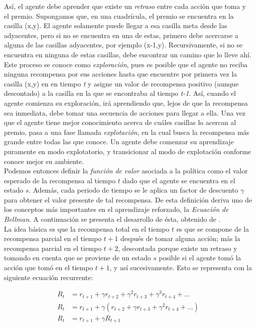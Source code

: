 As\'i, el agente debe aprender que existe un \textit{retraso} entre cada acci\'on que toma y el premio. Supongamos que, en una cuadr\'icula, el premio se encuentra en la casilla (x,y). El agente solamente puede llegar a esa casilla meta desde las adyacentes, pero si no se encuentra en una de estas, primero debe acercarse a alguna de las casillas adyacentes, por ejemplo (x-1,y). Recursivamente, si no se encuentra en ninguna de estas casillas, debe encontrar un camino que lo lleve ah\'i. Este proceso se conoce como \textit{exploraci\'on}, pues es posible que el agente no reciba ninguna recompensa por sus acciones hasta que encuentre por primera vez la casilla (x,y) en en tiempo \textit{t} y asigne un valor de recompensa positivo (aunque descontado) a la casilla en la que se encontraba al tiempo \textit{t-1}. As\'i, cuando el agente comienza su exploraci\'on, ir\'a aprendiendo que, lejos de que la recompensa sea inmediata, debe tomar una secuencia de acciones para llegar a ella. Una vez que el agente tiene mejor conocimiento acerca de cu\'ales casillas lo acercan al premio, pasa a una fase llamada \textit{explotaci\'on}, en la cual busca la recompensa m\'as grande entre todas las que conoce. Un agente debe comenzar su aprendizaje puramente en modo explotatorio, y transicionar al modo de explotaci\'on conforme conoce mejor su ambiente.\\

Podemos entonces definir la \textit{funci\'on de valor} asociada a la pol\'itica como el valor esperado de la recompensa al tiempo $t$ dado que el agente se encuentra en el estado $s$. Adem\'as, cada periodo de tiempo se le aplica un factor de descuento $\gamma$ para obtener el valor presente de tal recompensa. De esta definici\'on deriva uno de los conceptos m\'as importantes en el aprendizaje reforzado, la \textit{Ecuaci\'on de Bellman}. A continuaci\'on se presenta el desarrollo de \'esta, obtenido de \citet{Sutton}. \\

La idea b\'asica es que la recompensa total en el tiempo $t$ es que se compone de la recompensa parcial en el tiempo $t+1$ despu\'es de tomar alguna acci\'on; m\'as la recompensa parcial en el tiempo $t+2$, descontada porque existe un retraso y tomando en cuenta que se proviene de un estado $s$ posible si el agente tom\'o la acci\'on que tom\'o en el tiempo $t+1$, y as\'i sucesivamente. Esto se representa con la siguiente ecuaci\'on recurrente:

\vspace{-30pt}
\begin{align*}
R_{t} &= r_{t+1} + \gamma r_{t+2} + \gamma^{2} r_{t+3} + \gamma^{3} r_{t+4} + ... \\
R_{t} &= r_{t+1} + \gamma \left( r_{t+2} + \gamma r_{t+3} + \gamma^{2}r_{t+4} + ...  \right)  \\
R_{t} &= r_{t+1} + \gamma R_{t+1}
\end{align*}

